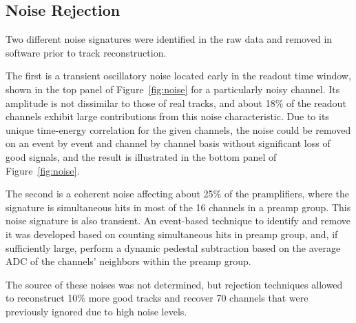 \documentclass[twocolumn,showpacs,superscriptaddress,groupedaddress]{revtex4}
\begin{document}
\subsection{Noise Rejection}
Two different noise signatures were identified in the raw data and removed in software prior to track reconstruction.  

The first is a transient oscillatory noise located early in the readout time window, shown in the top panel of Figure~\ref{fig:noise} for a particularly noisy channel.  Its amplitude is not dissimilar to those of real tracks, and about 18\% of the readout channels exhibit large contributions from this noise characteristic.  Due to its unique time-energy correlation for the given channels, the noise could be removed on an event by event and channel by channel basis without significant loss of good signals, and the result is illustrated in the bottom panel of Figure~\ref{fig:noise}.

The second is a coherent noise affecting about 25\% of the pramplifiers, where the signature is simultaneous hits in most of the 16 channels in a preamp group.  This noise signature is also transient.  An event-based technique to identify and remove it was developed based on counting simultaneous hits in preamp group, and, if sufficiently large, perform a dynamic pedestal subtraction based on the average ADC of the channels' neighbors within the preamp group.

The source of these noises was not determined, but rejection techniques allowed to reconstruct 10\% more good tracks and recover 70 channels that were previously ignored due to high noise levels.
\end{document}
